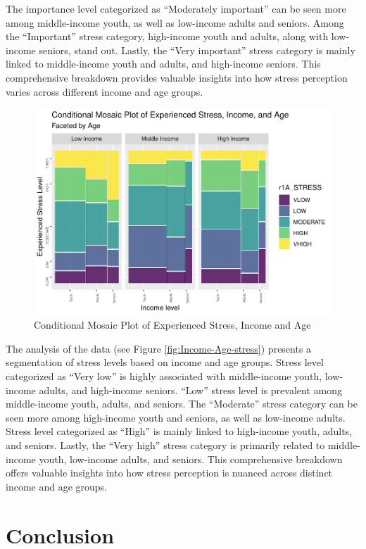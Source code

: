 \documentclass[
11pt, %
oneside, %
english, %
singlespacing, %
]{macthesis} %
\begin{document}
The importance level categorized as ``Moderately important'' can be seen more among middle-income youth, as well as low-income adults and seniors. Among the ``Important'' stress category, high-income youth and adults, along with low-income seniors, stand out. Lastly, the ``Very important'' stress category is mainly linked to middle-income youth and adults, and high-income seniors. This comprehensive breakdown provides valuable insights into how stress perception varies across different income and age groups.
\begin{figure}
\includegraphics[width=0.85\linewidth]{thesis_files/figure-latex/unnamed-chunk-32-1} \caption{\label{fig:Income-Age-stress}Conditional Mosaic Plot of Experienced Stress, Income and Age}\label{fig:unnamed-chunk-32}
\end{figure}
The analysis of the data (see Figure \ref{fig:Income-Age-stress}) presents a segmentation of stress levels based on income and age groups. Stress level categorized as ``Very low'' is highly associated with middle-income youth, low-income adults, and high-income seniors. ``Low'' stress level is prevalent among middle-income youth, adults, and seniors. The ``Moderate'' stress category can be seen more among high-income youth and seniors, as well as low-income adults. Stress level categorized as ``High'' is mainly linked to high-income youth, adults, and seniors. Lastly, the ``Very high'' stress category is primarily related to middle-income youth, low-income adults, and seniors. This comprehensive breakdown offers valuable insights into how stress perception is nuanced across distinct income and age groups.

\hypertarget{conclusion}{%
\section{Conclusion}\label{conclusion}}
\end{document}
